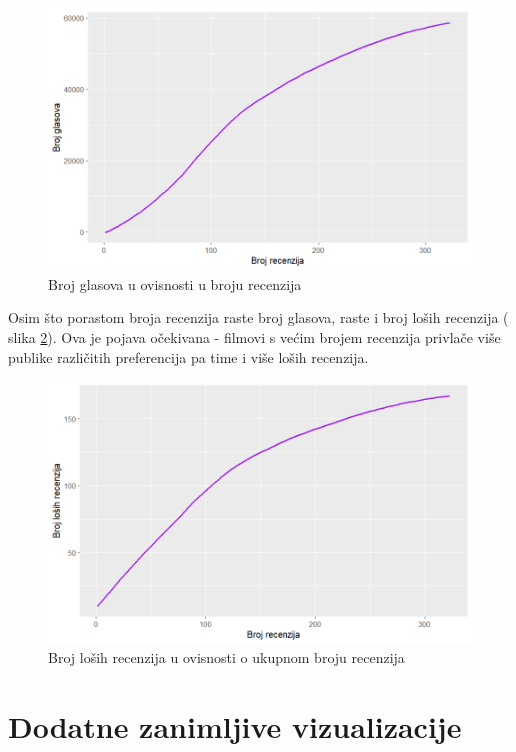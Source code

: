 	\begin{figure}[H]
		\centering
		\includegraphics[width=15cm]{../figures/lucija_slozeni/recenzijeglasovi.png}
		\caption{Broj glasova u ovisnosti u broju recenzija}
		\label{napredni3}
	\end{figure}
	
	Osim što porastom broja recenzija raste broj glasova, raste i broj loših recenzija ( slika \ref{napredni4}). Ova je pojava očekivana - filmovi s većim brojem recenzija privlače više publike različitih preferencija pa time i više loših recenzija. 
	
	\begin{figure}[H]
		\centering
		\includegraphics[width=15cm]{../figures/lucija_slozeni/recenzijelose.png}
		\caption{Broj loših recenzija u ovisnosti o ukupnom broju recenzija}
		\label{napredni4}
	\end{figure}
	
	\newpage
	
	\section{Dodatne zanimljive vizualizacije}
	
